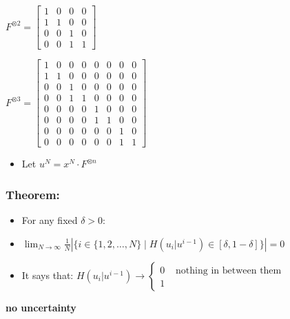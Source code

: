 \documentclass[11pt]{article}
\providecommand{\tightlist}{%
      \setlength{\itemsep}{0pt}\setlength{\parskip}{0pt}}
\begin{document}
\(F^{\otimes 2} = \begin{bmatrix} 1 & 0 & 0 & 0 \\ 1 & 1 & 0 & 0 \\ 0 & 0 & 1 & 0 \\ 0 & 0 & 1 & 1 \end{bmatrix}\)

\(F^{\otimes 3} = \begin{bmatrix} 1 & 0 & 0 & 0 & 0 & 0 & 0 & 0 \\ 1 & 1 & 0 & 0 & 0 & 0 & 0 & 0 \\ 0 & 0 & 1 & 0 & 0 & 0 & 0 & 0 \\ 0 & 0 & 1 & 1 & 0 & 0 & 0 & 0 \\ 0 & 0 & 0 & 0 & 1 & 0 & 0 & 0 \\ 0 & 0 & 0 & 0 & 1 & 1 & 0 & 0 \\ 0 & 0 & 0 & 0 & 0 & 0 & 1 & 0 \\ 0 & 0 & 0 & 0 & 0 & 0 & 1 & 1 \end{bmatrix}\)

\begin{itemize}
\tightlist
\item
  Let \(u^N = x^N \cdot F^{\otimes n}\)
\end{itemize}

\subsubsection{Theorem:}\label{theorem}

\begin{itemize}
\item
  For any fixed \(\delta > 0\):
\item
  \(\boxed{\lim_{N \to \infty} \frac{1}{N} \left| \{ i \in \{1, 2, \dots, N\} \mid H(u_i | u^{i-1}) \in [\delta, 1-\delta] \} \right| = 0}\)
\item
  It says that:
  \(H(u_i | u^{i-1}) \to \begin{cases} 0       & \boxed{\text{ nothing in between them}} \\ 1 \end{cases}\)
\end{itemize}

\textbf{no uncertainty}
\end{document}
